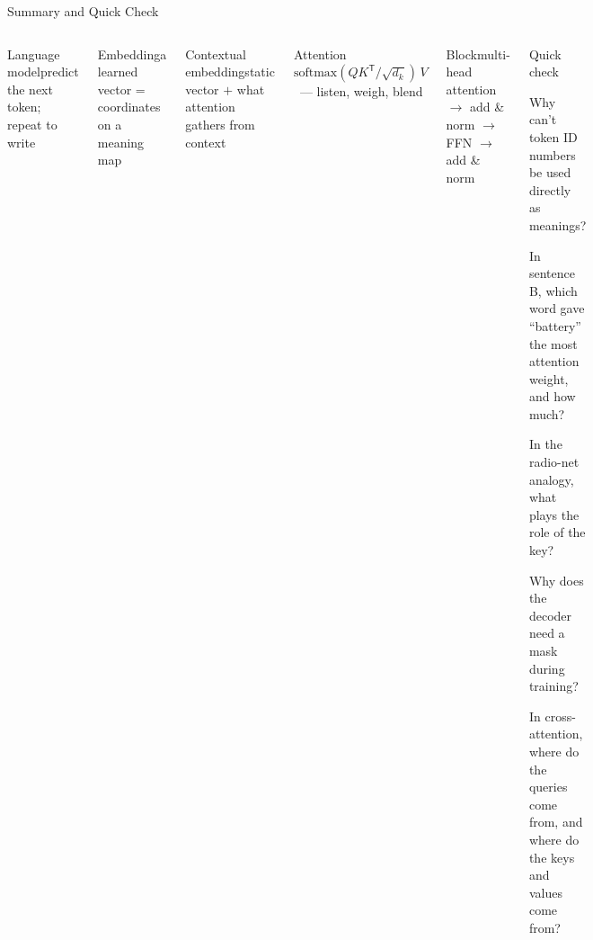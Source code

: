\documentclass[aspectratio=169,10pt]{beamer}
\begin{document}
\begin{frame}{Summary and Quick Check}
\begin{columns}[T]
\begin{fbx}{Language model}predict the next token; repeat to write\end{fbx}
\begin{fbx}{Embedding}a learned vector = coordinates on a meaning map\end{fbx}
\begin{fbx}{Contextual embedding}static vector $+$ what attention gathers from context\end{fbx}
\begin{fbx}{Attention}$\text{softmax}(QK^{\mathsf T}/\sqrt{d_k})\,V$ \ --- listen, weigh, blend\end{fbx}
\begin{fbx}{Block}multi-head attention $\to$ add \& norm $\to$ FFN $\to$ add \& norm\end{fbx}
\begin{cbox}{Quick check}
\begin{te}
\item Why can't token ID numbers be used directly as meanings?
\item In sentence B, which word gave ``battery'' the most attention weight, and how much?
\item In the radio-net analogy, what plays the role of the key?
\item Why does the decoder need a mask during training?
\item In cross-attention, where do the queries come from, and where do the keys and values come from?
\end{te}
\end{cbox}
\end{columns}
\end{frame}
\end{document}
